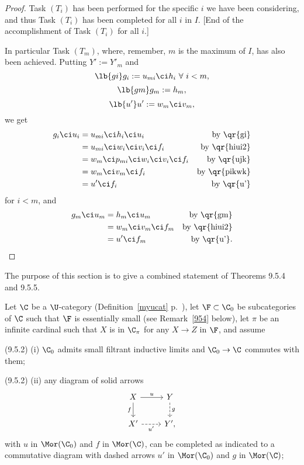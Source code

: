 \documentclass[12pt]{article}
\theoremstyle{remark}
\theoremstyle{definition}
\begin{document}
\begin{proof}
Task $(T_i)$ has been performed for the specific $i$ we have been considering, and thus Task $(T_i)$ has been completed for all $i$ in $I$. [End of the accomplishment of Task $(T_i)$ for all $i$.]

In particular Task $(T_m)$, where, remember, $m$ is the maximum of $I$, has also been achieved. Putting $Y':=Y'_m$ and 
\begin{equation}\lb{gi}
g_i:=u_{mi}\ci h_i\ \forall\ i<m,
\end{equation} 
\begin{equation}\lb{gm}
g_m:=h_m,
\end{equation} 
\begin{equation}\lb{u'}
u':=w_m\ci v_m,
\end{equation} 
we get 
\begin{align*}
g_i\ci u_i&=u_{mi}\ci h_i\ci u_i&\text{by \qr{gi}}\\ 
&=u_{mi}\ci w_i\ci v_i\ci f_i&\text{by \qr{hiui2}}\\ 
&=w_m\ci p_{mi}\ci w_i\ci v_i\ci f_i&\text{by \qr{ujk}}\\ 
&=w_m\ci v_m\ci f_i&\text{by \qr{pikwk}}\\ 
&=u'\ci f_i&\text{by \qr{u'}}
\end{align*} 
for $i<m$, and 
\begin{align*}
g_m\ci u_m&=h_m\ci u_m&\text{by \qr{gm}}\\ 
&=w_m\ci v_m\ci f_m&\text{by \qr{hiui2}}\\ 
&=u'\ci f_m&\text{by \qr{u'}}.
\end{align*}
\end{proof}



The purpose of this section is to give a combined statement of Theorems 9.5.4 and 9.5.5. 

Let $\C$ be a $\U$-category (Definition~\ref{myucat} p.~), let $\F\subset\C_0$ be subcategories of $\C$ such that $\F$ is essentially small (see Remark~\ref{954} below), let $\pi$ be an infinite cardinal such that $X$ is in $\C_\pi$ for any $X\to Z$ in $\F$, and assume 

\nn(9.5.2) (i) $\C_0$ admits small filtrant inductive limits and $\C_0\to\C$ commutes with them;

\nn(9.5.2) (ii) any diagram of solid arrows
$$
\begin{tikzcd}
X\ar{d}[swap]{f}\ar{r}{u}&Y\ar[dashed]{d}{g}\\ 
X'\ar[dashed]{r}[swap]{u'}&Y',
\end{tikzcd}
$$ 
with $u$ in $\Mor(\C_0)$ and $f$ in $\Mor(\C)$, can be completed as indicated to a commutative diagram with dashed arrows $u'$ in $\Mor(\C_0)$ and $g$ in $\Mor(\C)$; 
\end{document}

